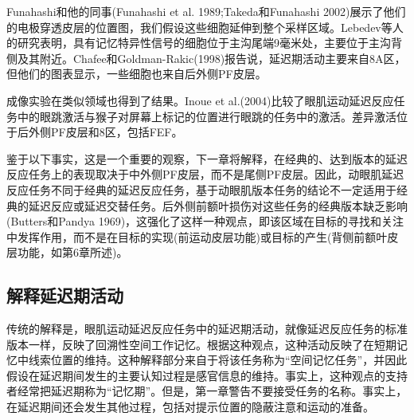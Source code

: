 Funahashi和他的同事(Funahashi et al. 1989;Takeda和Funahashi 2002)展示了他们的电极穿透皮层的位置图，我们假设这些细胞延伸到整个采样区域。Lebedev等人的研究表明，具有记忆特异性信号的细胞位于主沟尾端9毫米处，主要位于主沟背侧及其附近。Chafee和Goldman-Rakic(1998)报告说，延迟期活动主要来自8A区，但他们的图表显示，一些细胞也来自后外侧PF皮层。

成像实验在类似领域也得到了结果。Inoue et al.(2004)比较了眼肌运动延迟反应任务中的眼跳激活与猴子对屏幕上标记的位置进行眼跳的任务中的激活。差异激活位于后外侧PF皮层和8区，包括FEF。

鉴于以下事实，这是一个重要的观察，下一章将解释，在经典的、达到版本的延迟反应任务上的表现取决于中外侧PF皮层，而不是尾侧PF皮层。因此，动眼肌延迟反应任务不同于经典的延迟反应任务，基于动眼肌版本任务的结论不一定适用于经典的延迟反应或延迟交替任务。后外侧前额叶损伤对这些任务的经典版本缺乏影响(Butters和Pandya 1969)，这强化了这样一种观点，即该区域在目标的寻找和关注中发挥作用，而不是在目标的实现(前运动皮层功能)或目标的产生(背侧前额叶皮层功能，如第6章所述)。

\subsection{解释延迟期活动}
传统的解释是，眼肌运动延迟反应任务中的延迟期活动，就像延迟反应任务的标准版本一样，反映了回溯性空间工作记忆。根据这种观点，这种活动反映了在短期记忆中线索位置的维持。这种解释部分来自于将该任务称为“空间记忆任务”，并因此假设在延迟期间发生的主要认知过程是感官信息的维持。事实上，这种观点的支持者经常把延迟期称为“记忆期”。但是，第一章警告不要接受任务的名称。事实上，在延迟期间还会发生其他过程，包括对提示位置的隐蔽注意和运动的准备。

